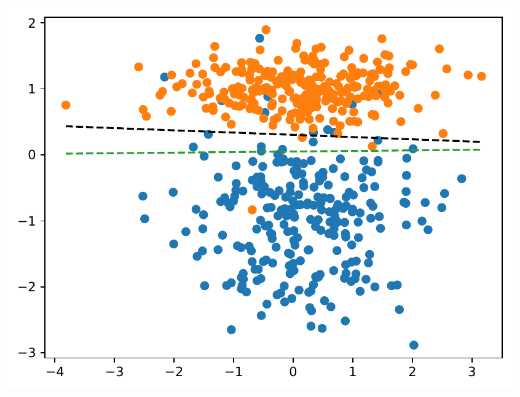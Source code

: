 \documentclass{beamer}
\begin{document}
{{            {\centering
            \includegraphics[width=.4\textwidth]{images/logreg_reg}\\
            }
        }


    }
\end{document}
